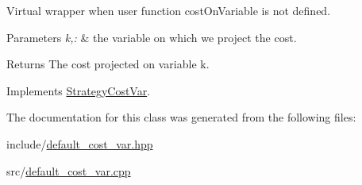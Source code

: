 \-Virtual wrapper when user function cost\-On\-Variable is not defined. 


\begin{DoxyParams}{\-Parameters}
{\em k,\-:} & the variable on which we project the cost. \\
\hline
\end{DoxyParams}
\begin{DoxyReturn}{\-Returns}
\-The cost projected on variable k. 
\end{DoxyReturn}


\-Implements \hyperlink{classStrategyCostVar_a8381829dfa84b3460822aa0e3677a443}{\-Strategy\-Cost\-Var}.



\-The documentation for this class was generated from the following files\-:\begin{DoxyCompactItemize}
\item 
include/\hyperlink{default__cost__var_8hpp}{default\-\_\-cost\-\_\-var.\-hpp}\item 
src/\hyperlink{default__cost__var_8cpp}{default\-\_\-cost\-\_\-var.\-cpp}\end{DoxyCompactItemize}
